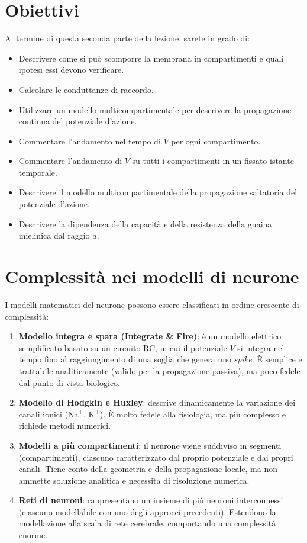 \section*{Obiettivi}
Al termine di questa seconda parte della lezione, sarete in grado di:
\begin{itemize}
    \item Descrivere come si può scomporre la membrana in compartimenti e quali ipotesi essi devono verificare.
    \item Calcolare le conduttanze di raccordo.
    \item Utilizzare un modello multicompartimentale per descrivere la propagazione continua del potenziale d'azione.
    \item Commentare l'andamento nel tempo di $V$ per ogni compartimento.
    \item Commentare l'andamento di $V$ su tutti i compartimenti in un fissato istante temporale.
    \item Descrivere il modello multicompartimentale della propagazione saltatoria del potenziale d'azione.
    \item Descrivere la dipendenza della capacità e della resistenza della guaina mielinica dal raggio $a$.
\end{itemize}

\section{Complessità nei modelli di neurone}
I modelli matematici del neurone possono essere classificati in ordine crescente di complessità:
\begin{enumerate}
    \item \textbf{Modello integra e spara (Integrate \& Fire)}: è un modello elettrico semplificato basato su un circuito RC, in cui il potenziale $V$ si integra nel tempo fino al raggiungimento di una soglia che genera uno \textit{spike}. È semplice e trattabile analiticamente (valido per la propagazione passiva), ma poco fedele dal punto di vista biologico.
    \item \textbf{Modello di Hodgkin e Huxley}: descrive dinamicamente la variazione dei canali ionici ($\text{Na}^+$, $\text{K}^+$). È molto fedele alla fisiologia, ma più complesso e richiede metodi numerici.
    \item \textbf{Modelli a più compartimenti}: il neurone viene suddiviso in segmenti (compartimenti), ciascuno caratterizzato dal proprio potenziale e dai propri canali. Tiene conto della geometria e della propagazione locale, ma non ammette soluzione analitica e necessita di risoluzione numerica.
    \item \textbf{Reti di neuroni}: rappresentano un insieme di più neuroni interconnessi (ciascuno modellabile con uno degli approcci precedenti). Estendono la modellazione alla scala di rete cerebrale, comportando una complessità enorme.
\end{enumerate}

